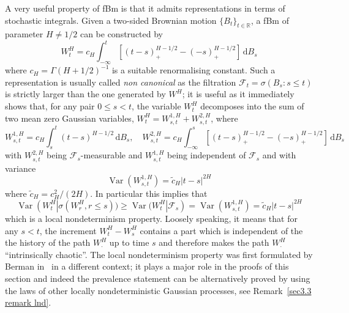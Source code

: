 \documentclass[10pt]{article}
\newcommand{\mathd}{\mathrm{d}}
\newcommand{\nobracket}{}
\newcommand{\tmem}[1]{{\em #1\/}}
\newcommand{\tmop}[1]{\ensuremath{\operatorname{#1}}}
\begin{document}
A very useful property of fBm is that it admits representations in terms of
stochastic integrals. Given a two-sided Brownian motion $\{ B_t \}_{t \in
\mathbb{R}}$, a fBm of parameter $H \neq 1 / 2$ can be constructed by
\begin{equation}
  W^H_t = c_H \int_{- \infty}^t [(t - s)^{H - 1 / 2}_+ - (- s)_+^{H - 1 / 2}]
  \, \mathd B_s \label{sec2.2 non canonical representation}
\end{equation}
where $c_H = \Gamma (H + 1 / 2)^{- 1}$ is a suitable renormalising constant.
Such a representation is usually called {\tmem{non canonical}} as the
filtration $\mathcal{F}_t = \sigma (B_s : s \leqslant t)$ is strictly larger
than the one generated by $W^H$; it is useful as it immediately shows that,
for any pair $0 \leqslant s < t$, the variable $W^H_t$ decomposes into the sum
of two mean zero Gaussian variables, $W^H_t = W^{1, H}_{s, t} + W^{2, H}_{s,
t}$, where
\[ W^{1, H}_{s, t} = c_H \int_s^t (t - s)^{H - 1 / 2} \, \mathd B_s, \quad
   W^{2, H}_{s, t} = c_H \int_{- \infty}^s [(t - s)^{H - 1 / 2}_+ - (- s)_+^{H
   - 1 / 2}] \, \mathd B_s \]
with $W^{2, H}_{s, t}$ being $\mathcal{F}_s$-measurable and $W^{1, H}_{s, t}$
being independent of $\mathcal{F}_s$ and with variance
\[ \tmop{Var} (W^{1, H}_{s, t}) = \tilde{c}_H | t - s |^{2 H} \]
where $\tilde{c}_H = c_H^2 / (2 H)$. In particular this implies that
\begin{equation}
  \tmop{Var} (W^H_t | \sigma (W^H_r, r \leqslant s \nobracket)) \geqslant
  \tmop{Var} (W^H_t | \mathcal{F}_s \nobracket) = \tmop{Var} (W^{1, H}_{s, t})
  = \tilde{c}_H | t - s |^{2 H} \label{sec2.2 lnd}
\end{equation}
which is a local nondeterminism property. Loosely speaking, it means that for
any $s < t$, the increment $W_t^H - W^H_s$ contains a part which is
independent of the the history of the path $W^H_{\cdot}$ up to time $s$ and
therefore makes the path $W^H_{\cdot}$ ``intrinsically chaotic''. The local
nondeterminism property was first formulated by Berman in~{\cite{berman73}} in
a different context; it plays a major role in the proofs of this section and
indeed the prevalence statement can be alternatively proved by using the laws
of other locally nondeterministic Gaussian processes, see Remark~\ref{sec3.3
remark lnd}.

\
\end{document}
